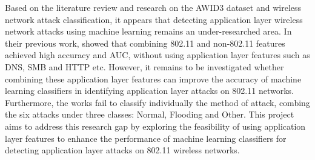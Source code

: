 Based on the literature review and research on the AWID3 dataset and wireless network attack classification, it appears that detecting application layer wireless network attacks using machine learning remains an under-researched area. In their previous work, \cite{s22155633} showed that combining 802.11 and non-802.11 features achieved high accuracy and AUC, without using application layer features such as DNS, SMB and HTTP etc. However, it remains to be investigated whether combining these application layer features can improve the accuracy of machine learning classifiers in identifying application layer attacks on 802.11 networks. Furthermore, the works fail to classify individually the method of attack, combing the six attacks under three classes: Normal, Flooding and Other. This project aims to address this research gap by exploring the feasibility of using application layer features to enhance the performance of machine learning classifiers for detecting application layer attacks on 802.11 wireless networks.